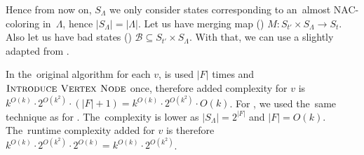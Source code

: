 Hence from now on, \( S_\Lambda \) we only consider states corresponding to
an~almost NAC-coloring in~\( \Lambda \), hence \( |S_\Lambda| = |\Lambda| \).
%
Let us have%
merging map ()
\( M : S_{t'} \times S_\Lambda \to S_t \).
Also let us have bad states ()
\( \mathcal{B} \subseteq S_{t'} \times S_\Lambda \).
%
With that, we can use a slightly adapted 
from \JoinNode{}.


In the~original algorithm for each \( v \),
\IntroduceEdgeNode{} is used \( |F| \) times
and \( \textsc{Introduce Vertex Node}{} \) once, therefore added complexity for \( v \)
is \( {k}^{O(k)} \cdot 2^{O(k^2)} \cdot (|F| + 1) = {k}^{O(k)} \cdot 2^{O(k^2)} \cdot O(k) \).
%
For \IntroduceVertexWithEdgesNode{},
we used the~same technique as for \JoinNode{}.
The~complexity is lower as \( |S_\Lambda| = 2^{|F|} \) and \( |F| = O(k) \).
The~runtime complexity added for \( v \) is therefore
\( {k}^{O(k)} \cdot 2^{O(k^2)} \cdot 2^{O(k)} = {k}^{O(k)} \cdot 2^{O(k^2)}\).

